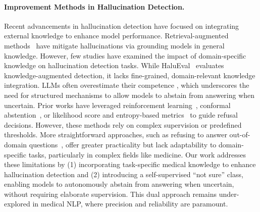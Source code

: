 \paragraph{Improvement Methods in Hallucination Detection.}

Recent advancements in hallucination detection have focused on integrating external knowledge to enhance model performance. Retrieval-augmented methods~\citep{lewis2021retrievalaugmentedgenerationknowledgeintensivenlp_241, li2023weboysterimprovinglarge_242} have mitigate hallucinations via grounding models in general knowledge. However, few studies have examined the impact of domain-specific knowledge on hallucination detection tasks. While HaluEval~\citep{Hallueval} evaluates knowledge-augmented detection, it lacks fine-grained, domain-relevant knowledge integration. LLMs often overestimate their competence \citep{zhang2023sirenssongaiocean_247}, which underscores the need for structured mechanisms to allow models to abstain from answering when uncertain. Prior works have leveraged reinforcement learning~\cite{xu2024rejectionimprovesreliabilitytraining_246}, conformal abstention~\citep{yadkori2024mitigatingllmhallucinationsconformal_245}, or likelihood score and entropy-based metrics~\citep{cole2023selectivelyansweringambiguousquestions_248} to guide refusal decisions. However, these methods rely on complex supervision or predefined thresholds. More straightforward approaches, such as refusing to answer out-of-domain questions~\citep{cao2024learnrefusemakinglarge_244}, offer greater practicality but lack adaptability to domain-specific tasks, particularly in complex fields like medicine. Our work addresses these limitations by (1) incorporating task-specific medical knowledge to enhance hallucination detection and (2) introducing a self-supervised “not sure” class, enabling models to autonomously abstain from answering when uncertain, without requiring elaborate supervision. This dual approach remains under-explored in medical NLP, where precision and reliability are paramount.

\vspace{-3mm}